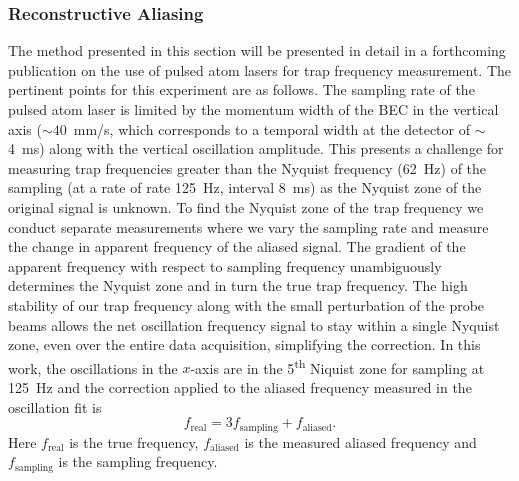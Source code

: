 \documentclass[%
 amsmath,amssymb,
aps,
]{revtex4-2}
\begin{document}
\subsubsection{Reconstructive Aliasing}
The method presented in this section will be presented in detail in a forthcoming publication on the use of pulsed atom lasers for trap frequency measurement. The pertinent points for this experiment are as follows.
The sampling rate of the pulsed atom laser is limited by the momentum width of the BEC in the vertical axis (\(\sim40\)~mm/s, which corresponds to a temporal width at the detector of \(\sim\)4~ms) along with the vertical oscillation amplitude. This presents a challenge for measuring trap frequencies greater than the Nyquist  frequency (62~Hz) of the sampling (at a rate of rate 125~Hz, interval 8~ms) as the Nyquist zone of the original signal is unknown. To find the Nyquist zone of the trap frequency we conduct separate measurements where we vary the sampling rate and measure the change in apparent frequency of the aliased signal. The gradient of the apparent frequency with respect to sampling frequency unambiguously determines the Nyquist zone and in turn the true trap frequency. The high stability of our trap frequency along with the small perturbation of the probe beams allows the net oscillation frequency signal to stay within a single Nyquist zone, even over the entire data acquisition, simplifying the correction. 
In this work, the oscillations in the \(x\)-axis are in the 5\textsuperscript{th} Niquist zone for sampling at 125~Hz and the correction applied to the aliased frequency measured in the oscillation fit is
\begin{equation}
    f_{\text{real}}=3 f_{\text{sampling}} + f_{\text{aliased}}.
\end{equation}
Here \(f_{\text{real}}\) is the true frequency, \(f_{\text{aliased}}\) is the measured aliased frequency and  \(f_{\text{sampling}}\) is the sampling frequency. %
\end{document}

